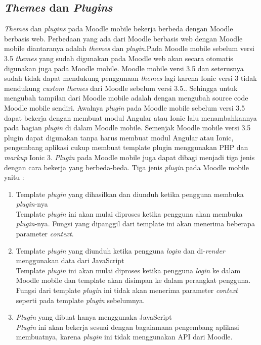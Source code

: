\subsection{\textit{Themes} dan \textit{Plugins}}
\textit{Themes} dan \textit{plugins} pada Moodle mobile bekerja berbeda dengan Moodle berbasis web. Perbedaan yang ada dari Moodle berbasis web dengan Moodle mobile diantaranya adalah \textit{themes} dan \textit{plugin}.Pada Moodle mobile sebelum versi 3.5 \textit{themes} yang sudah digunakan pada Moodle web akan secara otomatis digunakan juga pada Moodle mobile. Moodle mobile versi 3.5 dan seterusnya sudah tidak dapat mendukung penggunaan \textit{themes} lagi karena Ionic versi 3 tidak mendukung \textit{custom themes} dari Moodle sebelum versi 3.5.\cite{moodle:dev}. Sehingga untuk mengubah tampilan dari Moodle mobile adalah dengan mengubah source code Moodle mobile sendiri. Awalnya \textit{plugin} pada Moodle mobile sebelum versi 3.5 dapat bekerja dengan membuat modul Angular atau Ionic lalu menambahkannya pada bagian \textit{plugin} di dalam Moodle mobile. Semenjak Moodle mobile versi 3.5 plugin dapat digunakan tanpa harus membuat modul Angular atau Ionic, pengembang aplikasi cukup membuat template plugin menggunakan PHP dan \textit{markup} Ionic 3\cite{moodle:dev}. \textit{Plugin} pada Moodle mobile juga dapat dibagi menjadi tiga jenis dengan cara bekerja yang berbeda-beda. Tiga jenis \textit{plugin} pada Moodle mobile yaitu :

	\begin{enumerate}
	\item Template \textit{plugin} yang dihasilkan dan diunduh ketika pengguna membuka \textit{plugin}-nya\\
		Template \textit{plugin} ini akan mulai diproses ketika pengguna akan membuka \textit{plugin}-nya. Fungsi yang dipanggil dari template ini akan menerima beberapa parameter \textit{context}.
		
	\item Template \textit{plugin} yang diunduh ketika pengguna \textit{login} dan di-\textit{render} menggunakan data dari JavaScript \\
		Template \textit{plugin} ini  akan mulai diproses ketika pengguna \textit{login} ke dalam Moodle mobile dan template akan disimpan ke dalam perangkat pengguna. Fungsi dari template \textit{plugin} ini tidak akan menerima parameter \textit{context} seperti pada template \textit{plugin} sebelumnya.
	\item \textit{Plugin} yang dibuat hanya menggunaka JavaScript \\
		\textit{Plugin} ini akan bekerja sesuai dengan bagaiamana pengembang aplikasi membuatnya, karena \textit{plugin} ini tidak menggunakan API dari Moodle.
	\end{enumerate}

